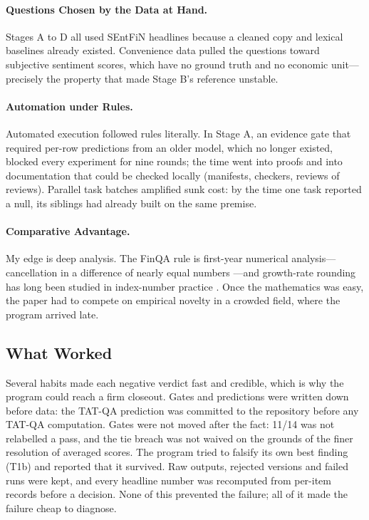 \documentclass[11pt]{article}
\begin{document}
\paragraph{Questions Chosen by the Data at Hand.} Stages A to D all used SEntFiN headlines because a cleaned copy and lexical baselines already existed. Convenience data pulled the questions toward subjective sentiment scores, which have no ground truth and no economic unit---precisely the property that made Stage B's reference unstable.

\paragraph{Automation under Rules.} Automated execution followed rules literally. In Stage A, an evidence gate that required per-row predictions from an older model, which no longer existed, blocked every experiment for nine rounds; the time went into proofs and into documentation that could be checked locally (manifests, checkers, reviews of reviews). Parallel task batches amplified sunk cost: by the time one task reported a null, its siblings had already built on the same premise.

\paragraph{Comparative Advantage.} My edge is deep analysis. The FinQA rule is first-year numerical analysis---cancellation in a difference of nearly equal numbers \citep{higham2002accuracy}---and growth-rate rounding has long been studied in index-number practice \citep{gittings1991rounding}. Once the mathematics was easy, the paper had to compete on empirical novelty in a crowded field, where the program arrived late.

\subsection{What Worked}

Several habits made each negative verdict fast and credible, which is why the program could reach a firm closeout. Gates and predictions were written down before data: the TAT-QA prediction was committed to the repository before any TAT-QA computation. Gates were not moved after the fact: 11/14 was not relabelled a pass, and the tie breach was not waived on the grounds of the finer resolution of averaged scores. The program tried to falsify its own best finding (T1b) and reported that it survived. Raw outputs, rejected versions and failed runs were kept, and every headline number was recomputed from per-item records before a decision. None of this prevented the failure; all of it made the failure cheap to diagnose.
\end{document}
